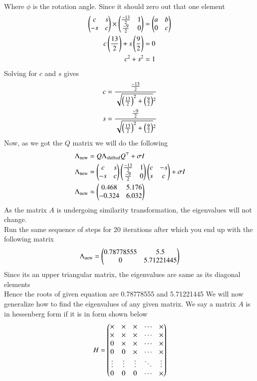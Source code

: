 \documentclass[journal]{IEEEtran}
\begin{document}
Where $\phi$ is the rotation angle. Since it should zero out that one element\\
\begin{align}
	\begin{pmatrix}c & s\\-s & c\end{pmatrix} \times \begin{pmatrix}\frac{-13}{2} & 1\\ \frac{-9}{2} & 0\end{pmatrix} &= \begin{pmatrix}a & b\\ 0 & c\end{pmatrix}\\
	c\left(\frac{13}{2}\right) + s\left(\frac{9}{2}\right) &= 0\\
	c^2+s^2 &= 1
\end{align}
Solving for $c$ and $s$ gives
\begin{align}
	c &= \frac{\frac{-13}{2}}{\sqrt{\left(\frac{13}{2}\right)^2+\left(\frac{9}{2}\right)}^2}\\
	s &= \frac{\frac{-9}{2}}{\sqrt{\left(\frac{13}{2}\right)^2+\left(\frac{9}{2}\right)}^2}
\end{align}
Now, as we got the $Q$ matrix we will do the following
\begin{align}
\Lambda_{\text{new}} &= Q\Lambda_{\text{shifted}}Q^\top + \sigma I\\
\Lambda_{\text{new}} &= \begin{pmatrix}c & s\\-s & c\end{pmatrix}\begin{pmatrix}\frac{-13}{2} & 1\\ \frac{-9}{2} & 0\end{pmatrix}\begin{pmatrix}c & -s\\s & c\end{pmatrix} + \sigma I\\
\Lambda_{\text{new}} &\approx \begin{pmatrix}0.468 & 5.176\\-0.324 & 6.032\end{pmatrix} 
\end{align}
As the matrix $A$ is undergoing similarity transformation, the eigenvalues will not change.\\
Run the same sequence of steps for 20 iterations after which you end up with the following matrix
\begin{align}
    \Lambda_{\text{new}} = \begin{pmatrix}0.78778555 & 5.5\\ 0 & 5.71221445\end{pmatrix}
\end{align}
Since its an upper triangular matrix, the eigenvalues are same as its diagonal elements\\
Hence the roots of given equation are 0.78778555 and 5.71221445\newline \newline
We will now generalize how to find the eigenvalues of any given matrix. We say a matrix $A$ is in hessenberg form if it is in form shown below
\begin{align}
H = 
\begin{pmatrix}
\times & \times & \times & \cdots & \times \\
\times & \times & \times & \cdots & \times \\
0      & \times & \times & \cdots & \times \\
0      & 0      & \times & \cdots & \times \\
\vdots & \vdots & \vdots & \ddots & \vdots \\
0      & 0      & 0      & \cdots & \times
\end{pmatrix}
\end{align}
\end{document}
